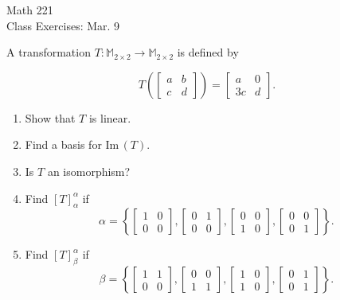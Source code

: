 \documentclass[11pt]{article}
\newcommand{\Image}{\textrm{Im}\,}
\begin{document}
\begin{center}
\Large
\rm{Math 221}
\\
\rm{Class Exercises:  Mar. 9}
\\
\end{center}
\vspace{0.2in}

A transformation $T:\mathbb{M}_{2\times 2}\to\mathbb{M}_{2\times 2}$ is defined by 

\begin{displaymath}
T\left(\left[ \begin{array}{cc} a & b \\ c & d \end{array}\right]\right) =   \left[ \begin{array}{cc} a & 0 \\ 3c & d \end{array}\right].
\end{displaymath}

\begin{enumerate}
	\item {Show that $T$ is linear.}
	\item {Find a basis for $\Image(T)$.}
	\item {Is $T$ an isomorphism?}
	\item {Find $[T]_{\alpha}^{\alpha}$ if
\begin{displaymath}
\alpha = \left\{
\left[ \begin{array}{cc} 1 & 0 \\ 0 & 0   \end{array}\right],
\left[ \begin{array}{cc} 0 & 1  \\ 0 & 0   \end{array}\right],
\left[ \begin{array}{cc} 0 & 0  \\ 1 & 0   \end{array}\right],
\left[ \begin{array}{cc} 0 & 0  \\ 0 & 1   \end{array}\right]
\right\}.
\end{displaymath}	
}
	\item {Find $[T]_{\beta}^{\alpha}$ if
	\begin{displaymath}
	\beta = \left\{
	\left[ \begin{array}{cc} 1 & 1 \\ 0 & 0   \end{array}\right],
	\left[ \begin{array}{cc} 0 & 0  \\ 1 & 1   \end{array}\right],
	\left[ \begin{array}{cc} 1 & 0  \\ 1 & 0   \end{array}\right],
	\left[ \begin{array}{cc} 0 & 1  \\ 0 & 1   \end{array}\right]
	\right\}.
	\end{displaymath}	
}
\end{enumerate}
\end{document}
